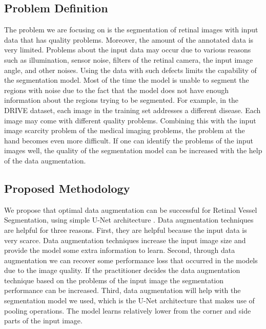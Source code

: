 \documentclass{article}
\begin{document}
\subsection{Problem Definition}
The problem we are focusing on is the segmentation of retinal images with input data that has quality problems. Moreover, the amount of the annotated data is very limited. Problems about the input data may occur due to various reasons such as illumination, sensor noise, filters of the retinal camera, the input image angle, and other noises. Using the data with such defects limits the capability of the segmentation model. Most of the time the model is unable to segment the regions with noise due to the fact that the model does not have enough information about the regions trying to be segmented. For example, in the DRIVE dataset, each image in the training set addresses a different disease. Each image may come with different quality problems. Combining this with the input image scarcity problem of the medical imaging problems, the problem at the hand becomes even more difficult. If one can identify the problems of the input images well, the quality of the segmentation model can be increased with the help of the data augmentation.

\subsection{Proposed Methodology}

We propose that optimal data augmentation can be successful for Retinal Vessel Segmentation, using simple U-Net architecture \cite{ronneberger2015unet}. Data augmentation techniques are helpful for three reasons. First, they are helpful because the input data is very scarce. Data augmentation techniques increase the input image size and provide the model some extra information to learn.  Second,  through data augmentation we can recover some performance loss that occurred in the models due to the image quality. If the practitioner decides the data augmentation technique based on the problems of the input image the segmentation performance can be increased. Third,  data augmentation will help with the segmentation model we used, which is the U-Net architecture that makes use of pooling operations. The model learns relatively lower from the corner and side parts of the input image.\\\\
\end{document}
